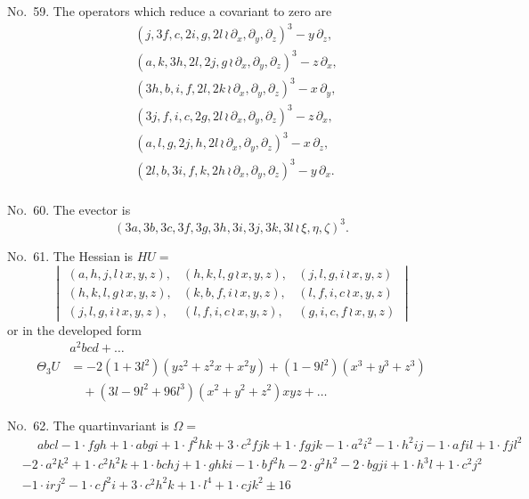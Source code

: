 \documentclass[11pt,a4paper]{article}
\begin{document}
\noindent\textsc{No.~59.} The operators which reduce a covariant to zero are
\begin{align*}
&(j, 3f, c, 2i, g, 2l \, \wr\, \partial_x, \partial_y, \partial_z)^3 - y\,\partial_z,\\
&(a, k, 3h, 2l, 2j, g \, \wr\, \partial_x, \partial_y, \partial_z)^3 - z\,\partial_x,\\
&(3h, b, i, f, 2l, 2k \, \wr\, \partial_x, \partial_y, \partial_z)^3 - x\,\partial_y,\\
&(3j, f, i, c, 2g, 2l \, \wr\, \partial_x, \partial_y, \partial_z)^3 - z\,\partial_x,\\
&(a, l, g, 2j, h, 2l \, \wr\, \partial_x, \partial_y, \partial_z)^3 - x\,\partial_z,\\
&(2l, b, 3i, f, k, 2h \, \wr\, \partial_x, \partial_y, \partial_z)^3 - y\,\partial_x.\\
\end{align*}

\noindent\textsc{No.~60.} The evector is
\[(3a, 3b, 3c, 3f, 3g, 3h, 3i, 3j, 3k, 3l \, \wr\, \xi, \eta, \zeta)^3.\]

\noindent\textsc{No.~61.} The Hessian is $HU =$
\[
\begin{vmatrix}
(a, h, j, l \, \wr\, x, y, z), & (h, k, l, g \, \wr\, x, y, z), & (j, l, g, i \, \wr\, x, y, z) \\
(h, k, l, g \, \wr\, x, y, z), & (k, b, f, i \, \wr\, x, y, z), & (l, f, i, c \, \wr\, x, y, z) \\
(j, l, g, i \, \wr\, x, y, z), & (l, f, i, c \, \wr\, x, y, z), & (g, i, c, f \, \wr\, x, y, z)
\end{vmatrix}
\]
or in the developed form
\begin{align*}
&a^2bcd + \ldots \\
\Theta_3 U &= -2(1 + 3l^2)(yz^2 + z^2x + x^2y) + (1 - 9l^2)(x^3 + y^3 + z^3)\\
&\quad + (3l - 9l^2 + 96l^3)(x^2 + y^2 + z^2)xyz + \ldots
\end{align*}

\clearpage
\noindent\textsc{No.~62.} The quartinvariant is $\Omega =$
\begin{align*}
&\phantom{+} abcl - 1\cdot fgh + 1\cdot abgi + 1\cdot f^2hk + 3\cdot c^2fjk + 1\cdot fgjk - 1\cdot a^2i^2 - 1\cdot h^2ij - 1\cdot afil + 1\cdot fjl^2\\
& - 2\cdot a^2k^2 + 1\cdot c^2h^2k + 1\cdot bchj + 1\cdot ghki - 1\cdot bf^2h - 2\cdot g^2h^2 - 2\cdot bgji + 1\cdot h^3l + 1\cdot c^2j^2\\
& - 1\cdot irj^2 - 1\cdot cf^2i + 3\cdot c^2h^2k + 1\cdot l^4 + 1\cdot cjk^2 \pm 16
\end{align*}
\end{document}
